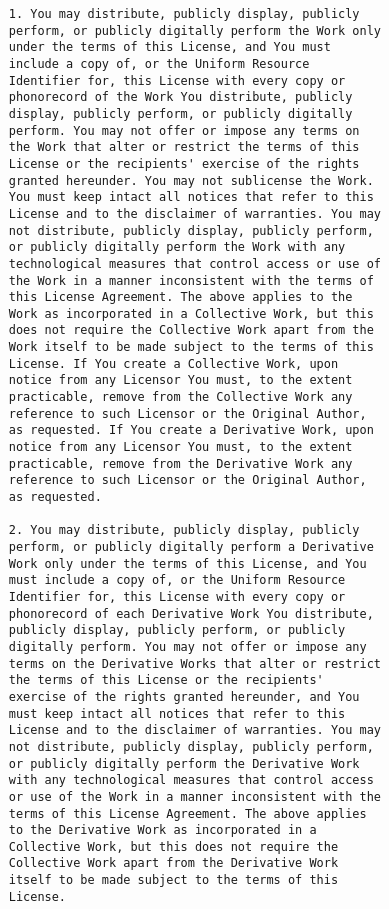 \begin{verbatim}
           1. You may distribute, publicly display, publicly
           perform, or publicly digitally perform the Work only
           under the terms of this License, and You must
           include a copy of, or the Uniform Resource
           Identifier for, this License with every copy or
           phonorecord of the Work You distribute, publicly
           display, publicly perform, or publicly digitally
           perform. You may not offer or impose any terms on
           the Work that alter or restrict the terms of this
           License or the recipients' exercise of the rights
           granted hereunder. You may not sublicense the Work.
           You must keep intact all notices that refer to this
           License and to the disclaimer of warranties. You may
           not distribute, publicly display, publicly perform,
           or publicly digitally perform the Work with any
           technological measures that control access or use of
           the Work in a manner inconsistent with the terms of
           this License Agreement. The above applies to the
           Work as incorporated in a Collective Work, but this
           does not require the Collective Work apart from the
           Work itself to be made subject to the terms of this
           License. If You create a Collective Work, upon
           notice from any Licensor You must, to the extent
           practicable, remove from the Collective Work any
           reference to such Licensor or the Original Author,
           as requested. If You create a Derivative Work, upon
           notice from any Licensor You must, to the extent
           practicable, remove from the Derivative Work any
           reference to such Licensor or the Original Author,
           as requested.
        
           2. You may distribute, publicly display, publicly
           perform, or publicly digitally perform a Derivative
           Work only under the terms of this License, and You
           must include a copy of, or the Uniform Resource
           Identifier for, this License with every copy or
           phonorecord of each Derivative Work You distribute,
           publicly display, publicly perform, or publicly
           digitally perform. You may not offer or impose any
           terms on the Derivative Works that alter or restrict
           the terms of this License or the recipients'
           exercise of the rights granted hereunder, and You
           must keep intact all notices that refer to this
           License and to the disclaimer of warranties. You may
           not distribute, publicly display, publicly perform,
           or publicly digitally perform the Derivative Work
           with any technological measures that control access
           or use of the Work in a manner inconsistent with the
           terms of this License Agreement. The above applies
           to the Derivative Work as incorporated in a
           Collective Work, but this does not require the
           Collective Work apart from the Derivative Work
           itself to be made subject to the terms of this
           License.
        

\end{verbatim}
